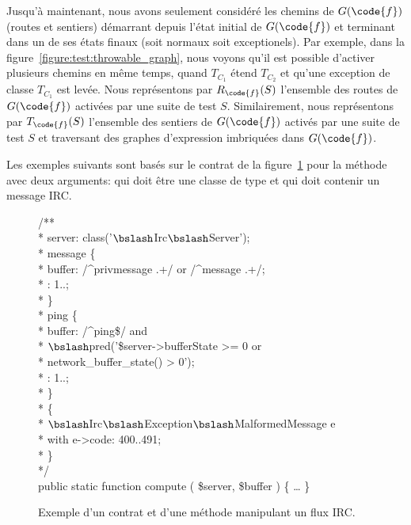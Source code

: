 Jusqu'à maintenant, nous avons seulement considéré les chemins de $G(\code{f})$
(routes et sentiers) démarrant depuis l'état initial de $G(\code{f})$ et
terminant dans un de ses états finaux (soit normaux soit exceptionels). Par
exemple, dans la figure~\ref{figure:test:throwable_graph}, nous voyons qu'il est
possible d'activer plusieurs chemins en même temps, quand $T_{C_1}$ étend
$T_{C_2}$ et qu'une exception de classe $T_{C_1}$ est levée. Nous représentons
par $R_\code{f}(S)$ l'ensemble des routes de $G(\code{f})$ activées par une
suite de test $S$. Similairement, nous représentons par $T_\code{f}(S)$
l'ensemble des sentiers de $G(\code{f})$ activés par une suite de test $S$ et
traversant des graphes d'expression imbriquées dans $G(\code{f})$.

Les exemples suivants sont basés sur le contrat de la
figure~\ref{figure:test:irc} pour la méthode  avec deux arguments:
 qui doit être une classe de type
 et  qui doit contenir un message
IRC.
%
\begin{figure}

\begin{bigpre}
/** \\
 * \arequires server: class('\(\bslash\)Irc\(\bslash\)Server'); \\
 * \abehavior message \{ \\
 *     \arequires buffer: /^privmessage .+/ or /^message .+/; \\
 *     \aensures  \aresult: 1..; \\
 * \} \\
 * \abehavior ping \{ \\
 *     \arequires buffer: /^ping\$/ and \\
 *               \(\bslash\)pred('\$server->bufferState   >= 0 or \\
 *                      network\_buffer\_state() >  0'); \\
 *     \aensures  \aresult: 1..; \\
 * \} \\
 * \adefault \{ \\
 *     \athrowable \(\bslash\)Irc\(\bslash\)Exception\(\bslash\)MalformedMessage e \\
 *                    with e->code: 400..491; \\
 * \} \\
 */ \\
public static function compute ( \$server, \$buffer ) \{ … \}
\end{bigpre}

\caption{\label{figure:test:irc} Exemple d'un contrat et d'une méthode
manipulant un flux IRC.}

\end{figure}
